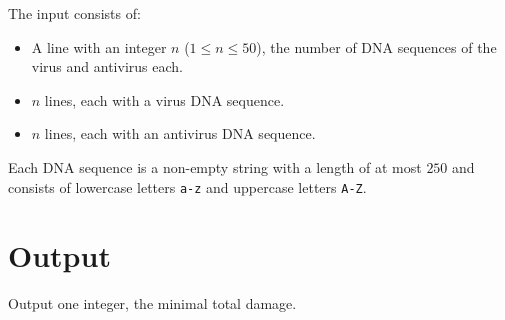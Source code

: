 The input consists of:

\begin{itemize}
	\item A line with an integer $n$ ($1 \leq n \leq 50$), the number of DNA sequences of the virus and antivirus each.
	\item $n$ lines, each with a virus DNA sequence.
	\item $n$ lines, each with an antivirus DNA sequence.
\end{itemize}

Each DNA sequence is a non-empty string with a length of at most $250$ and consists of lowercase letters \texttt{a-z} and uppercase letters \texttt{A-Z}.

\vspace{-5mm}
\section*{Output}
\vspace{-2mm}

Output one integer, the minimal total damage.
\vspace{-2mm}
